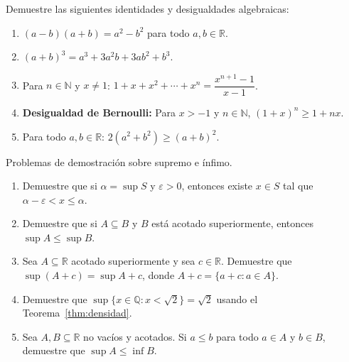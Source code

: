 \begin{prob}
Demuestre las siguientes identidades y desigualdades algebraicas:
\begin{enumerate}
   \item $(a-b)(a+b) = a^2 - b^2$ para todo $a, b \in \mathbb{R}$.
   \item $(a+b)^3 = a^3 + 3a^2b + 3ab^2 + b^3$.
   \item Para $n \in \mathbb{N}$ y $x \neq 1$:
         $1 + x + x^2 + \cdots + x^n = \dfrac{x^{n+1}-1}{x-1}$.
   \item \textbf{Desigualdad de Bernoulli:} Para $x > -1$ y $n \in
         \mathbb{N}$, $(1+x)^n \geq 1 + nx$.
   \item Para todo $a, b \in \mathbb{R}$:
         $2(a^2+b^2) \geq (a+b)^2$.
\end{enumerate}
\end{prob}

\begin{prob}
Problemas de demostración sobre supremo e ínfimo.

\begin{enumerate}
   \item Demuestre que si $\alpha = \sup S$ y $\varepsilon > 0$, entonces
         existe $x \in S$ tal que $\alpha - \varepsilon < x \leq \alpha$.
   \item Demuestre que si $A \subseteq B$ y $B$ está acotado superiormente,
         entonces $\sup A \leq \sup B$.
   \item Sea $A \subseteq \mathbb{R}$ acotado superiormente y sea
         $c \in \mathbb{R}$. Demuestre que $\sup(A + c) = \sup A + c$,
         donde $A + c = \{a + c : a \in A\}$.
   \item Demuestre que $\sup\{x \in \mathbb{Q} : x < \sqrt{2}\} = \sqrt{2}$
         usando el Teorema~\ref{thm:densidad}.
   \item Sea $A, B \subseteq \mathbb{R}$ no vacíos y acotados. Si $a \leq b$
         para todo $a \in A$ y $b \in B$, demuestre que $\sup A \leq \inf B$.
\end{enumerate}
\end{prob}

